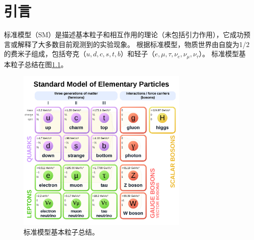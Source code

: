 \chapter{引言}\label{chap:introduction}
标准模型（SM）是描述基本粒子和相互作用的理论（未包括引力作用），它成功预言或解释了大多数目前观测到的实验现象。
根据标准模型，物质世界由自旋为1/2的费米子组成，包括夸克（$u, d, c, s, t, b$）和轻子（$e, \mu, \tau, \nu_e, \nu_{\mu}, \nu_{\tau}$）。
标准模型基本粒子总结在图\ref{fig:SM_particles}。
\begin{figure}
 \centering
 \includegraphics[width=0.75\textwidth]{fig/SM_particles.png}
 \caption{标准模型基本粒子总结。}
 \label{fig:SM_particles}
\end{figure}


